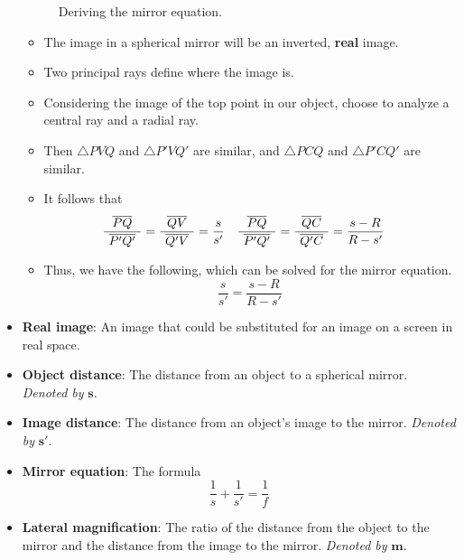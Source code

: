 \documentclass[../notes.tex]{subfiles}
\begin{document}
\begin{itemize}
\begin{figure}[h!]
        \caption{Deriving the mirror equation.}
        \label{fig:mirrorEquation}
    \end{figure}
    \begin{itemize}
        \item The image in a spherical mirror will be an inverted, \textbf{real} image.
        \item Two principal rays define where the image is.
        \item Considering the image of the top point in our object, choose to analyze a central ray and a radial ray.
        \item Then $\triangle PVQ$ and $\triangle P'VQ'$ are similar, and $\triangle PCQ$ and $\triangle P'CQ'$ are similar.
        \item It follows that
        \begin{align*}
            \frac{\overline{PQ}}{{\color{white}(}\overline{P'Q'}{\color{white})}} &= \frac{\overline{QV}}{{\color{white}(}\overline{Q'V}{\color{white})}} = \frac{s}{s'}&
            \frac{\overline{PQ}}{{\color{white}(}\overline{P'Q'}{\color{white})}} &= \frac{\overline{QC}}{{\color{white}(}\overline{Q'C}{\color{white})}} = \frac{s-R}{R-s'}
        \end{align*}
        \item Thus, we have the following, which can be solved for the mirror equation.
        \begin{equation*}
            \frac{s}{s'} = \frac{s-R}{R-s'}
        \end{equation*}
    \end{itemize}
    \item \textbf{Real image}: An image that could be substituted for an image on a screen in real space.
    \item \textbf{Object distance}: The distance from an object to a spherical mirror. \emph{Denoted by} $\bm{s}$.
    \item \textbf{Image distance}: The distance from an object's image to the mirror. \emph{Denoted by} $\bm{s'}$.
    \item \textbf{Mirror equation}: The formula
    \begin{equation*}
        \frac{1}{s}+\frac{1}{s'} = \frac{1}{f}
    \end{equation*}
    \item \textbf{Lateral magnification}: The ratio of the distance from the object to the mirror and the distance from the image to the mirror. \emph{Denoted by} $\bm{m}$.

\end{itemize}
\end{document}
